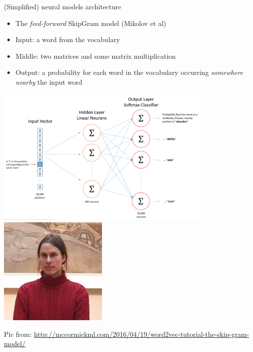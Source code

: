 \documentclass{beamer}
\begin{document}
\begin{frame}{(Simplified) neural models architecture}


\begin{small}
\begin{itemize}
    \item The {\it feed-forward} SkipGram model (Mikolov et al)
    \item Input: a word from the vocabulary
    \item Middle: two matrices and some matrix multiplication
    \item Output: a probability for each word in the vocabulary occurring {\it somewhere nearby} the input word 
\end{itemize}

\end{small}
    \includegraphics[width=0.8\textwidth]{figures/skipgram1}\includegraphics[height=0.2\textheight]{figures/mikolov.jpg}
    
    \tiny{Pic from: \url{http://mccormickml.com/2016/04/19/word2vec-tutorial-the-skip-gram-model/}}
\end{frame}
\end{document}
